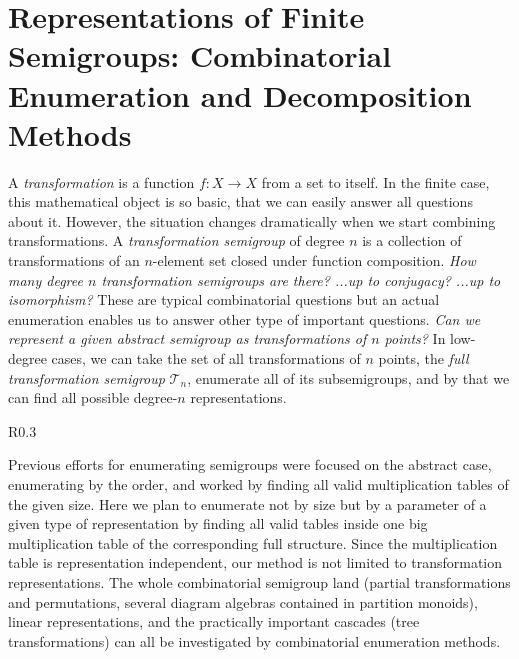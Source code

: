 \documentclass{amsart}
\newcommand{\T}{\mathcal T}
\newcommand{\I}{\mathcal I}
\newcommand{\cS}{\mathcal S}
\newcommand{\fB}{\mathfrak B}
\newcommand{\fJ}{\mathfrak J}
\begin{document}
\section*{Representations of Finite Semigroups: Combinatorial Enumeration and Decomposition Methods}

A \emph{transformation} is a function $f:X\rightarrow X$ from a set to itself.
In the finite case, this mathematical object is so basic, that we can easily answer all questions about it.
However, the situation changes dramatically when we start combining transformations.
A \emph{transformation semigroup} of degree $n$ is a collection of transformations of an $n$-element set closed under function composition.
\emph{How many degree $n$ transformation semigroups are there? ...up to conjugacy? ...up to isomorphism?}
These are typical combinatorial questions but an actual enumeration enables us to answer other type of important questions.
\emph{Can we represent a given abstract semigroup as transformations of $n$ points?}
In low-degree cases,  we can take the set of all transformations of $n$ points, the \emph{full transformation semigroup} $\T_n$, enumerate all of its subsemigroups, and by that we can find all possible degree-$n$ representations. 

\begin{wrapfigure}{R}{0.3\textwidth}
\end{wrapfigure}
Previous efforts for enumerating semigroups were focused on the abstract case, enumerating by the order, and worked by finding all valid multiplication tables of the given size.
Here we plan to enumerate not by size but by a parameter of a given type of representation by finding all valid tables inside one big multiplication table of the corresponding full structure.
Since the multiplication table is representation independent, our method is not limited to transformation representations.
The whole combinatorial semigroup land (partial transformations and permutations, several diagram algebras contained in partition monoids), linear representations, and the practically important cascades  (tree transformations) can all be investigated by combinatorial enumeration methods.
\end{document}
